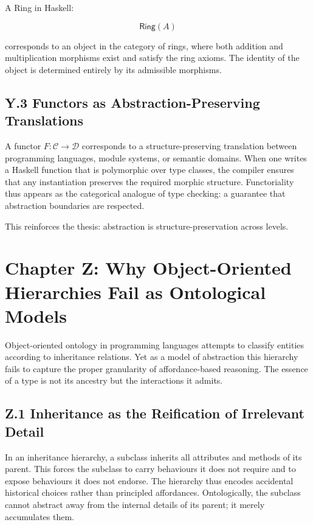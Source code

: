 \documentclass[11pt,letterpaper]{article}
\begin{document}
A Ring in Haskell:

\[
\mathsf{Ring}(A)
\]

corresponds to an object in the category of rings, where both addition and multiplication morphisms exist and satisfy the ring axioms. The identity of the object is determined entirely by its admissible morphisms.

\subsection{Y.3 Functors as Abstraction-Preserving Translations}

A functor \(F : \mathcal{C} \to \mathcal{D}\) corresponds to a structure-preserving translation between programming languages, module systems, or semantic domains. When one writes a Haskell function that is polymorphic over type classes, the compiler ensures that any instantiation preserves the required morphic structure. Functoriality thus appears as the categorical analogue of type checking: a guarantee that abstraction boundaries are respected.

This reinforces the thesis: abstraction is structure-preservation across levels.

\newpage

\section{Chapter Z: Why Object-Oriented Hierarchies Fail as Ontological Models}

Object-oriented ontology in programming languages attempts to classify entities according to inheritance relations. Yet as a model of abstraction this hierarchy fails to capture the proper granularity of affordance-based reasoning. The essence of a type is not its ancestry but the interactions it admits.

\subsection{Z.1 Inheritance as the Reification of Irrelevant Detail}

In an inheritance hierarchy, a subclass inherits all attributes and methods of its parent. This forces the subclass to carry behaviours it does not require and to expose behaviours it does not endorse. The hierarchy thus encodes accidental historical choices rather than principled affordances. Ontologically, the subclass cannot abstract away from the internal details of its parent; it merely accumulates them.
\end{document}
